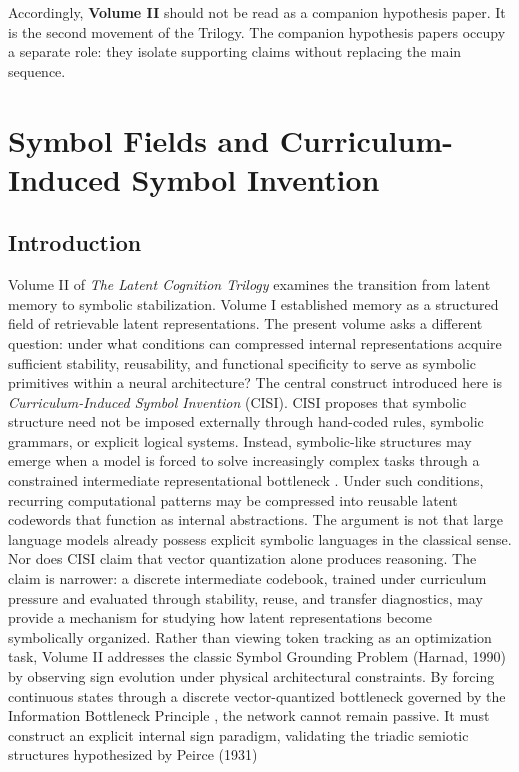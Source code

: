 Accordingly, \textbf{Volume II} should not be read as a companion hypothesis paper. It is the second movement of the Trilogy. The companion hypothesis papers occupy a separate role: they isolate supporting claims without replacing the main sequence.



\chapter{Symbol Fields and Curriculum-Induced Symbol Invention}
\section{Introduction}
Volume II of \textit{The Latent Cognition Trilogy} examines the transition from latent memory to symbolic stabilization. Volume I established memory as a structured field of retrievable latent representations. The present volume asks a different question: under what conditions can compressed internal representations acquire sufficient stability, reusability, and functional specificity to serve as symbolic primitives within a neural architecture?
The central construct introduced here is \textit{Curriculum-Induced Symbol Invention} (CISI). CISI proposes that symbolic structure need not be imposed externally through hand-coded rules, symbolic grammars, or explicit logical systems. Instead, symbolic-like structures may emerge when a model is forced to solve increasingly complex tasks through a constrained intermediate representational bottleneck \cite{Tishby2015}. Under such conditions, recurring computational patterns may be compressed into reusable latent codewords that function as internal abstractions.
The argument is not that large language models already possess explicit symbolic languages in the classical sense. Nor does CISI claim that vector quantization alone produces reasoning. The claim is narrower: a discrete intermediate codebook, trained under curriculum pressure and evaluated through stability, reuse, and transfer diagnostics, may provide a mechanism for studying how latent representations become symbolically organized.
Rather than viewing token tracking as an optimization task, Volume II addresses the classic Symbol Grounding Problem (Harnad, 1990) by observing sign evolution under physical architectural constraints. By forcing continuous states through a discrete vector-quantized bottleneck \cite{VanDenOord2017} governed by the Information Bottleneck Principle \cite{Tishby2015}, the network cannot remain passive. It must construct an explicit internal sign paradigm, validating the triadic semiotic structures hypothesized by Peirce (1931)
